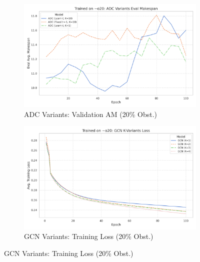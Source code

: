 \begin{figure}[htbp]
    \vspace{0.3cm}

    \begin{subfigure}[b]{0.48\textwidth}
        \centering
        \includegraphics[width=\textwidth]{trainplotbase/TRAINED_ON_20_OBS/training_curves_focused/condition_o20/adc_variants_eval_am.png} %
        \caption{ADC Variants: Validation AM (20\% Obst.)}
        \label{fig:adc_val_am_20obs}
    \end{subfigure}
    \hfill
    \begin{subfigure}[b]{0.48\textwidth}
        \centering
        \includegraphics[width=\textwidth]{trainplotbase/TRAINED_ON_20_OBS/training_curves_focused/condition_o20/gcn_variants_train_loss.png} %
        \caption{GCN Variants: Training Loss (20\% Obst.)}
        \label{fig:gcn_train_loss_20obs}
    \end{subfigure}

    \vspace{0.3cm}


\end{figure}
